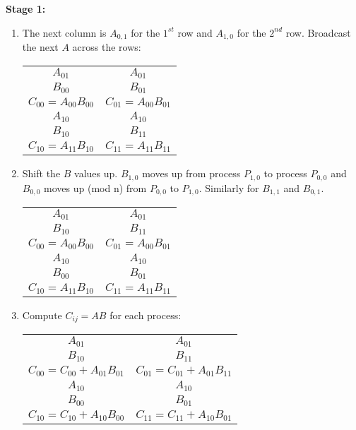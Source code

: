 \documentclass[]{scrartcl}
\begin{document}
\textbf{Stage 1:}
\begin{enumerate}
	\item The next column is $A_{0,1}$ for the $1^{st}$ row and $A_{1,0}$ for the $2^{nd}$ row. Broadcast the next $A$ across the rows:
		\begin{center}
		\begin{tabular}{|c|c|} 
			\hline
			$A_{01}$ 			  & $A_{01}$ \\
			$B_{00}$   			  & $B_{01}$ \\
			$C_{00}=A_{00}B_{00}$ & $C_{01}=A_{00}B_{01}$ \\
			$A_{10}$              & $A_{10}$ \\
			$B_{10}$     		  & $B_{11}$ \\
			$C_{10}=A_{11}B_{10}$ & $C_{11}=A_{11}B_{11}$ \\
			\hline
		\end{tabular}
	\end{center}
	\item Shift the $B$ values up. $B_{1,0}$ moves up from process $P_{1,0}$ to process $P_{0,0}$ and $B_{0,0}$ moves up (mod n) from $P_{0,0}$ to $P_{1,0}$. Similarly for $B_{1,1}$ and $B_{0,1}$.
	\begin{center}
		\begin{tabular}{|c|c|} 
			\hline
			$A_{01}$ 			  & $A_{01}$ \\
			$B_{10}$   			  & $B_{11}$ \\
			$C_{00}=A_{00}B_{00}$ & $C_{01}=A_{00}B_{01}$ \\
			$A_{10}$              & $A_{10}$ \\
			$B_{00}$     		  & $B_{01}$ \\
			$C_{10}=A_{11}B_{10}$ & $C_{11}=A_{11}B_{11}$ \\
			\hline
		\end{tabular}
	\end{center}
	\item Compute $C_{ij}=AB$ for each process:
		\begin{center}
		\begin{tabular}{|c|c|} 
			\hline
			$A_{01}$ 			  & $A_{01}$ \\
			$B_{10}$   			  & $B_{11}$ \\
			$C_{00}=C_{00}+A_{01}B_{01}$ & $C_{01}=C_{01}+A_{01}B_{11}$ \\
			$A_{10}$              & $A_{10}$ \\
			$B_{00}$     		  & $B_{01}$ \\
			$C_{10}=C_{10}+A_{10}B_{00}$ & $C_{11}=C_{11}+A_{10}B_{01}$ \\
			\hline
		\end{tabular}
	\end{center} 
\end{enumerate}
\end{document}
